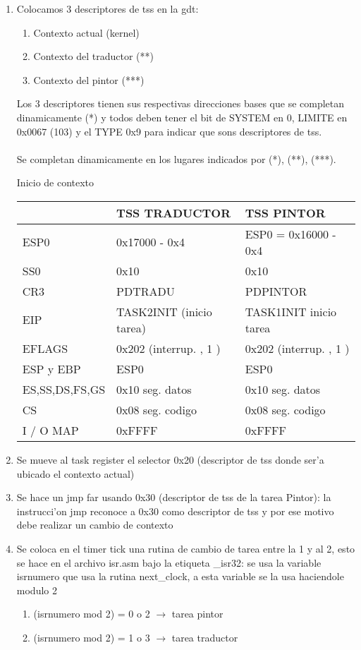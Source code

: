 \documentclass[11pt]{article}
\begin{document}
\begin{enumerate}
\item
Colocamos 3 descriptores de tss en la gdt:
\begin{enumerate}
\item
Contexto actual (kernel) 
\item
Contexto del traductor (**)
\item
Contexto del pintor (***)
\end{enumerate}
Los 3 descriptores tienen sus respectivas direcciones bases que se completan dinamicamente (*) y todos deben tener el bit de SYSTEM en 0, LIMITE en 0x0067 (103) y el TYPE 0x9 para indicar que sons descriptores de tss. \\
\\
Se completan dinamicamente en los lugares indicados por (*), (**), (***). \\
\begin{center} Inicio de contexto \\
\begin{tabular}[t]{|l|l|l|}
\hline
\textbf{} & \textbf{TSS TRADUCTOR} & \textbf{TSS PINTOR} \\
\hline
ESP0 & 0x17000 - 0x4 & ESP0 = 0x16000 - 0x4 \\
SS0 & 0x10 & 0x10 \\
CR3 & PDTRADU & PDPINTOR \\
EIP & TASK2INIT (inicio tarea) & TASK1INIT inicio tarea \\
EFLAGS & 0x202 (interrup. , 1 ) & 0x202 (interrup. , 1 ) \\
ESP y EBP & ESP0 & ESP0 \\
ES,SS,DS,FS,GS & 0x10 seg. datos & 0x10 seg. datos \\
CS & 0x08 seg. codigo & 0x08 seg. codigo \\
I / O MAP & 0xFFFF & 0xFFFF \\
\hline
\end{tabular}
\end{center}
\item
Se mueve al task register el selector 0x20 (descriptor de tss donde ser'a ubicado el contexto actual)

\item
Se hace un jmp far usando 0x30 (descriptor de tss de la tarea Pintor):
\indent	la instrucci'on jmp reconoce a 0x30 como descriptor de tss y por ese motivo debe realizar un cambio de contexto

\item
Se coloca en el timer tick una rutina de cambio de tarea entre la 1 y al 2, esto se hace en el archivo isr.asm bajo la etiqueta \_isr32:
\indent	se usa la variable isrnumero que usa la rutina next\_clock, a esta variable se la usa haciendole modulo 2
\begin{enumerate}
\item
(isrnumero mod 2) = 0 o 2 $\rightarrow$ tarea pintor

\item
(isrnumero mod 2) = 1 o 3 $\rightarrow$ tarea traductor

\end{enumerate}

\end{enumerate}
\end{document}
